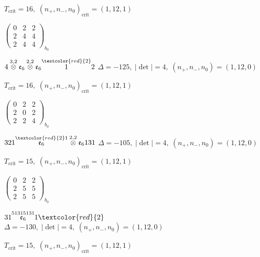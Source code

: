 \documentclass[10pt]{article}
\begin{document}
\hspace{1em}$T_{\text{crit}}=16,\; (n_+,n_-,n_0)_{\text{crit}}=(1,12,1)$

\hspace{2em}$\left(\begin{smallmatrix}0 & 2 & 2 \\ 2 & 4 & 4 \\ 2 & 4 & 4\end{smallmatrix}\right)_{\!b_0}$

\smallskip

$4\overset{3,2}{\otimes}\mathfrak{e}_6\overset{2,2}{\otimes}\mathfrak{e}_6\overset{\textcolor{red}{2}}{1}2$ \quad $\Delta=-125,\; |\det|=4,\; (n_+,n_-,n_0)=(1,12,0)$

\hspace{1em}$T_{\text{crit}}=16,\; (n_+,n_-,n_0)_{\text{crit}}=(1,12,1)$

\hspace{2em}$\left(\begin{smallmatrix}0 & 2 & 2 \\ 2 & 0 & 2 \\ 2 & 2 & 4\end{smallmatrix}\right)_{\!b_0}$

\smallskip

$321\overset{\textcolor{red}{2}1}{\mathfrak{e}_6}\overset{2,2}{\otimes}\mathfrak{e}_6131$ \quad $\Delta=-105,\; |\det|=4,\; (n_+,n_-,n_0)=(1,12,0)$

\hspace{1em}$T_{\text{crit}}=15,\; (n_+,n_-,n_0)_{\text{crit}}=(1,12,1)$

\hspace{2em}$\left(\begin{smallmatrix}0 & 2 & 2 \\ 2 & 5 & 5 \\ 2 & 5 & 5\end{smallmatrix}\right)_{\!b_0}$

\smallskip

$31\overset{51315131}{\mathfrak{e}_6}1\textcolor{red}{2}$ \quad $\Delta=-130,\; |\det|=4,\; (n_+,n_-,n_0)=(1,12,0)$

\hspace{1em}$T_{\text{crit}}=15,\; (n_+,n_-,n_0)_{\text{crit}}=(1,12,1)$
\end{document}
